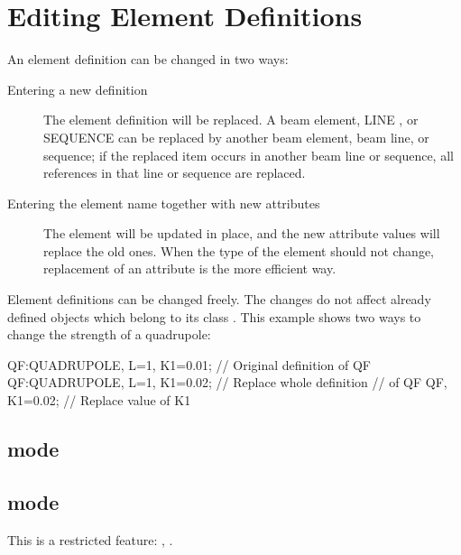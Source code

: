 \section{Editing Element Definitions}
\label{sec:elm-edit}
An element definition can be changed in two ways:
\begin{description}
\item[Entering a new definition]
  The element definition will be replaced.
  A beam element, {LINE} ,
  or {SEQUENCE} 
  can be replaced by another beam element, beam line, or sequence;
  if the replaced item occurs in another beam line or sequence,
  all references in that line or sequence are replaced.
\item[Entering the element name together with new attributes]
  The element will be updated in place,
  and the new attribute values will replace the old ones.
  When the type of the element should not change,
  replacement of an attribute is the more efficient way.
\end{description}
Element definitions can be changed freely.
The changes do not affect already defined objects which belong to
its class .
This example shows two ways to change the strength of a quadrupole:
\begin{example}
QF:QUADRUPOLE, L=1, K1=0.01; // Original definition of QF
QF:QUADRUPOLE, L=1, K1=0.02; // Replace whole definition
                             // of QF
QF, K1=0.02;                 // Replace value of K1
\end{example}
\subsection{\opalt mode}

\subsection{\opalcycl mode}

This is a restricted feature: \noopalt, \noopalcycl.



